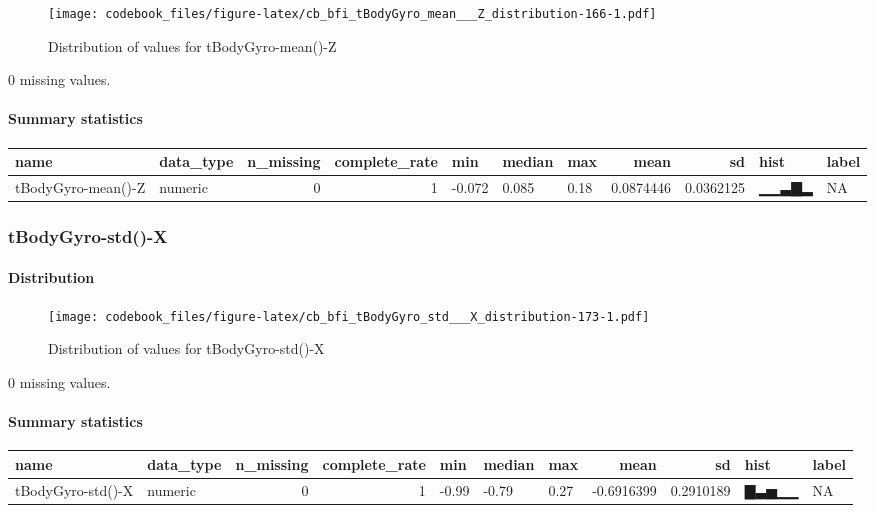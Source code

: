 \documentclass[
]{article}
\begin{document}
\begin{figure}
\centering
\texttt{[image: codebook\_files/figure-latex/cb\_bfi\_tBodyGyro\_mean\_\_\_Z\_distribution-166-1.pdf]}
\caption{Distribution of values for tBodyGyro-mean()-Z}
\end{figure}

0 missing values.

\hypertarget{tBodyGyro_mean___Z_summary}{%
\paragraph{Summary statistics}\label{tBodyGyro_mean___Z_summary}}

\begin{longtable}[]{@{}llrrlllrrll@{}}
\toprule
name & data\_type & n\_missing & complete\_rate & min & median & max &
mean & sd & hist & label \\
\midrule
\endhead
tBodyGyro-mean()-Z & numeric & 0 & 1 & -0.072 & 0.085 & 0.18 & 0.0874446
& 0.0362125 & ▁▁▃▇▂ & NA \\
\bottomrule
\end{longtable}

\hypertarget{tBodyGyro_std___X}{%
\subsubsection{tBodyGyro-std()-X}\label{tBodyGyro_std___X}}

\hypertarget{tBodyGyro_std___X_distribution}{%
\paragraph{Distribution}\label{tBodyGyro_std___X_distribution}}

\begin{figure}
\centering
\texttt{[image: codebook\_files/figure-latex/cb\_bfi\_tBodyGyro\_std\_\_\_X\_distribution-173-1.pdf]}
\caption{Distribution of values for tBodyGyro-std()-X}
\end{figure}

0 missing values.

\hypertarget{tBodyGyro_std___X_summary}{%
\paragraph{Summary statistics}\label{tBodyGyro_std___X_summary}}

\begin{longtable}[]{@{}llrrlllrrll@{}}
\toprule
name & data\_type & n\_missing & complete\_rate & min & median & max &
mean & sd & hist & label \\
\midrule
\endhead
tBodyGyro-std()-X & numeric & 0 & 1 & -0.99 & -0.79 & 0.27 & -0.6916399
& 0.2910189 & ▇▃▅▁▁ & NA \\
\bottomrule
\end{longtable}
\end{document}
